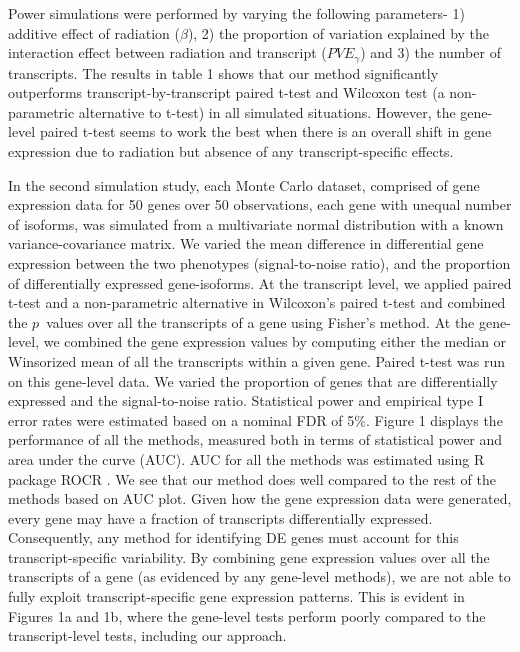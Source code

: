 \documentclass[hidelinks,11pt]{article}
\begin{document}
Power simulations were performed by varying the following parameters- 1) additive effect of radiation ($\beta$), 2) the proportion of variation explained by the interaction effect between radiation and transcript ($PVE_\gamma$) and 3) the number of transcripts. The results in table 1 shows that our method significantly outperforms transcript-by-transcript paired t-test and Wilcoxon test (a non-parametric alternative to t-test) in all simulated situations. However, the gene-level paired t-test seems to work the best when there is an overall shift in gene expression due to radiation but absence of any transcript-specific effects. 

In the second simulation study, each Monte Carlo dataset, comprised of gene expression data for 50 genes over 50 observations, each gene with unequal number of isoforms, was simulated from a multivariate normal distribution with a known variance-covariance matrix. We varied the mean difference in differential gene expression between the two phenotypes (signal-to-noise ratio), and the proportion of differentially expressed gene-isoforms. At the transcript level, we applied paired t-test and a non-parametric alternative in Wilcoxon's paired t-test and combined the $p$~values over all the transcripts of a gene using Fisher's method. At the gene-level, we combined the gene expression values by computing either the median or Winsorized mean of all the transcripts within a given gene. Paired t-test was run on this gene-level data. We varied the proportion of genes that are differentially expressed and the signal-to-noise ratio. Statistical power and empirical type I error rates were estimated based on a nominal FDR of 5\%. Figure 1 displays the performance of all the methods, measured both in terms of statistical power and area under the curve (AUC). AUC for all the methods was estimated using R package ROCR \cite{rocr}. We see that our method does well compared to the rest of the methods based on AUC plot. Given how the gene expression data were generated, every gene may have a fraction of transcripts differentially expressed. Consequently, any method for identifying DE genes must account for this transcript-specific variability. By combining gene expression values over all the transcripts of a gene (as evidenced by any gene-level methods), we are not able to fully exploit transcript-specific gene expression patterns. This is evident in Figures 1a and 1b, where the gene-level tests perform poorly compared to the transcript-level tests, including our approach.
\end{document}
